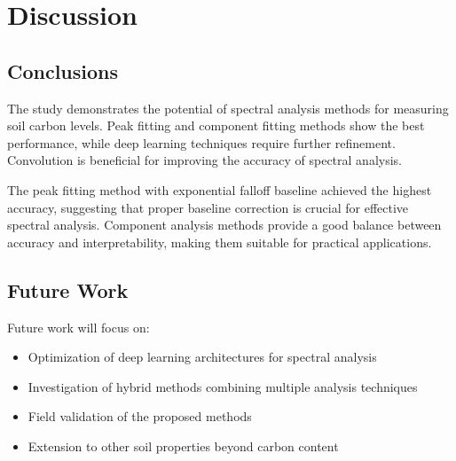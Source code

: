 \section{Discussion}

\subsection{Conclusions}

The study demonstrates the potential of spectral analysis methods for measuring soil carbon levels. Peak fitting and component fitting methods show the best performance, while deep learning techniques require further refinement. Convolution is beneficial for improving the accuracy of spectral analysis.

The peak fitting method with exponential falloff baseline achieved the highest accuracy, suggesting that proper baseline correction is crucial for effective spectral analysis. Component analysis methods provide a good balance between accuracy and interpretability, making them suitable for practical applications.

\subsection{Future Work}

Future work will focus on:
\begin{itemize}
\item Optimization of deep learning architectures for spectral analysis
\item Investigation of hybrid methods combining multiple analysis techniques
\item Field validation of the proposed methods
\item Extension to other soil properties beyond carbon content
\end{itemize}